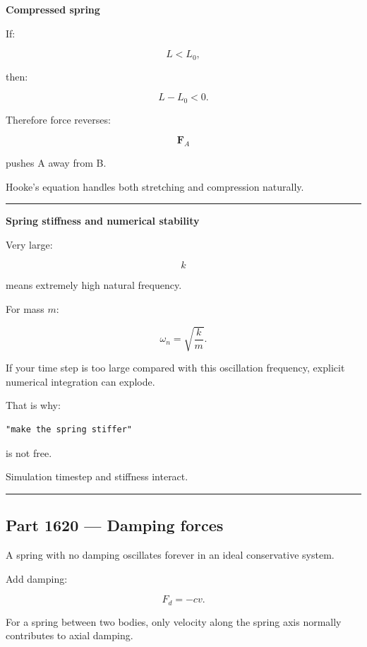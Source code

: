 \textbf{Compressed spring}

If:

\[
L<L_0,
\]

then:

\[
L-L_0<0.
\]

Therefore force reverses:

\[
\mathbf{F}_A
\]

pushes A away from B.

Hooke's equation handles both stretching and compression naturally.

\begin{center}\rule{0.5\linewidth}{0.5pt}\end{center}

\textbf{Spring stiffness and numerical stability}

Very large:

\[
k
\]

means extremely high natural frequency.

For mass \(m\):

\[
\omega_n
=
\sqrt{\frac{k}{m}}.
\]

If your time step is too large compared with this oscillation frequency, explicit numerical integration can explode.

That is why:

\begin{verbatim}
"make the spring stiffer"
\end{verbatim}

is not free.

Simulation timestep and stiffness interact.

\begin{center}\rule{0.5\linewidth}{0.5pt}\end{center}

\subsection{Part 1620 --- Damping forces}\label{06-engine-ii-ch034-part-1620-damping-forces}

\hypertarget{06-engine-ii-ch034-part-1620-damping-forces}{}

A spring with no damping oscillates forever in an ideal conservative system.

Add damping:

\[
\boxed{
F_d=-cv.
}
\]

For a spring between two bodies, only velocity along the spring axis normally contributes to axial damping.

